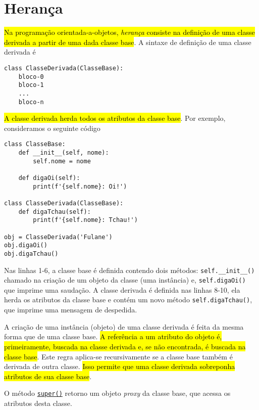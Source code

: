   

\section{Herança}\label{cap_oo_sec_her}

\hl{Na programação orientada-a-objetos, \emph{herança} consiste na definição de uma classe derivada a partir de uma dada classe base}. A sintaxe de definição de uma classe derivada é
\begin{lstlisting}
class ClasseDerivada(ClasseBase):
    bloco-0
    bloco-1
    ...
    bloco-n
\end{lstlisting}
\hl{A classe derivada herda todos os atributos da classe base}. Por exemplo, consideramos o seguinte código
\begin{lstlisting}
class ClasseBase:
    def __init__(self, nome):
        self.nome = nome
        
    def digaOi(self):
        print(f'{self.nome}: Oi!')

class ClasseDerivada(ClasseBase):
    def digaTchau(self):
        print(f'{self.nome}: Tchau!')

obj = ClasseDerivada('Fulane')
obj.digaOi()
obj.digaTchau()
\end{lstlisting}
Nas linhas 1-6, a classe base é definida contendo dois métodos: \lstinline+self.__init__()+ chamado na criação de um objeto da classe (uma instância) e, \lstinline+self.digaOi()+ que imprime uma saudação. A classe derivada é definida nas linhas 8-10, ela herda os atributos da classe base e contém um novo método \lstinline+self.digaTchau()+, que imprime uma mensagem de despedida.

A criação de uma instância (objeto) de uma classe derivada é feita da mesma forma que de uma classe base. \hl{A referência a um atributo do objeto é, primeiramente, buscada na classe derivada e, se não encontrada, é buscada na classe base}. Este regra aplica-se recursivamente se a classe base também é derivada de outra classe. \hl{Isso permite que uma classe derivada sobreponha atributos de sua classe base}.

\begin{obs}
O método \href{https://docs.python.org/3/library/functions.html#super}{\lstinline+super()+} retorno um objeto \textit{proxy} da classe base, que acessa os atributos desta classe.
\end{obs}

